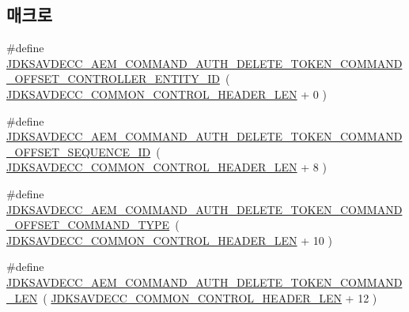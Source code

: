 \subsection*{매크로}
\begin{DoxyCompactItemize}
\item 
\#define \hyperlink{group__command__auth__delete__token_ga8b92d5d6dd13241a6266b9a7e298092f}{J\+D\+K\+S\+A\+V\+D\+E\+C\+C\+\_\+\+A\+E\+M\+\_\+\+C\+O\+M\+M\+A\+N\+D\+\_\+\+A\+U\+T\+H\+\_\+\+D\+E\+L\+E\+T\+E\+\_\+\+T\+O\+K\+E\+N\+\_\+\+C\+O\+M\+M\+A\+N\+D\+\_\+\+O\+F\+F\+S\+E\+T\+\_\+\+C\+O\+N\+T\+R\+O\+L\+L\+E\+R\+\_\+\+E\+N\+T\+I\+T\+Y\+\_\+\+ID}~( \hyperlink{group__jdksavdecc__avtp__common__control__header_gaae84052886fb1bb42f3bc5f85b741dff}{J\+D\+K\+S\+A\+V\+D\+E\+C\+C\+\_\+\+C\+O\+M\+M\+O\+N\+\_\+\+C\+O\+N\+T\+R\+O\+L\+\_\+\+H\+E\+A\+D\+E\+R\+\_\+\+L\+EN} + 0 )
\item 
\#define \hyperlink{group__command__auth__delete__token_gadbe52ca24509143f8d2ea63b4a6e94f9}{J\+D\+K\+S\+A\+V\+D\+E\+C\+C\+\_\+\+A\+E\+M\+\_\+\+C\+O\+M\+M\+A\+N\+D\+\_\+\+A\+U\+T\+H\+\_\+\+D\+E\+L\+E\+T\+E\+\_\+\+T\+O\+K\+E\+N\+\_\+\+C\+O\+M\+M\+A\+N\+D\+\_\+\+O\+F\+F\+S\+E\+T\+\_\+\+S\+E\+Q\+U\+E\+N\+C\+E\+\_\+\+ID}~( \hyperlink{group__jdksavdecc__avtp__common__control__header_gaae84052886fb1bb42f3bc5f85b741dff}{J\+D\+K\+S\+A\+V\+D\+E\+C\+C\+\_\+\+C\+O\+M\+M\+O\+N\+\_\+\+C\+O\+N\+T\+R\+O\+L\+\_\+\+H\+E\+A\+D\+E\+R\+\_\+\+L\+EN} + 8 )
\item 
\#define \hyperlink{group__command__auth__delete__token_ga65f985d980c4cff10a537935956dda70}{J\+D\+K\+S\+A\+V\+D\+E\+C\+C\+\_\+\+A\+E\+M\+\_\+\+C\+O\+M\+M\+A\+N\+D\+\_\+\+A\+U\+T\+H\+\_\+\+D\+E\+L\+E\+T\+E\+\_\+\+T\+O\+K\+E\+N\+\_\+\+C\+O\+M\+M\+A\+N\+D\+\_\+\+O\+F\+F\+S\+E\+T\+\_\+\+C\+O\+M\+M\+A\+N\+D\+\_\+\+T\+Y\+PE}~( \hyperlink{group__jdksavdecc__avtp__common__control__header_gaae84052886fb1bb42f3bc5f85b741dff}{J\+D\+K\+S\+A\+V\+D\+E\+C\+C\+\_\+\+C\+O\+M\+M\+O\+N\+\_\+\+C\+O\+N\+T\+R\+O\+L\+\_\+\+H\+E\+A\+D\+E\+R\+\_\+\+L\+EN} + 10 )
\item 
\#define \hyperlink{group__command__auth__delete__token_gae99ef096c9374049377dbc7c54bd42a3}{J\+D\+K\+S\+A\+V\+D\+E\+C\+C\+\_\+\+A\+E\+M\+\_\+\+C\+O\+M\+M\+A\+N\+D\+\_\+\+A\+U\+T\+H\+\_\+\+D\+E\+L\+E\+T\+E\+\_\+\+T\+O\+K\+E\+N\+\_\+\+C\+O\+M\+M\+A\+N\+D\+\_\+\+L\+EN}~( \hyperlink{group__jdksavdecc__avtp__common__control__header_gaae84052886fb1bb42f3bc5f85b741dff}{J\+D\+K\+S\+A\+V\+D\+E\+C\+C\+\_\+\+C\+O\+M\+M\+O\+N\+\_\+\+C\+O\+N\+T\+R\+O\+L\+\_\+\+H\+E\+A\+D\+E\+R\+\_\+\+L\+EN} + 12 )
\end{DoxyCompactItemize}
